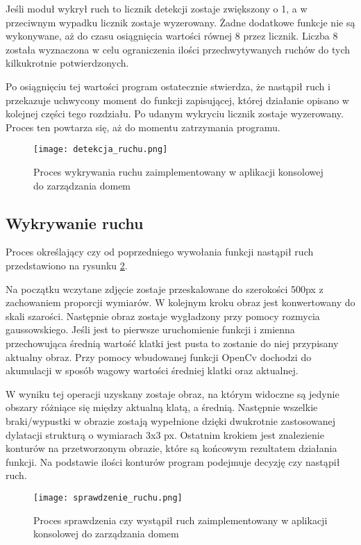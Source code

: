 Jeśli moduł wykrył ruch to licznik detekcji zostaje zwiększony o 1, a w przeciwnym wypadku licznik zostaje wyzerowany. Żadne dodatkowe funkcje nie są wykonywane, aż do czasu osiągnięcia wartości równej 8 przez licznik. Liczba 8 została wyznaczona w celu ograniczenia ilości przechwytywanych ruchów do tych kilkukrotnie potwierdzonych.

Po osiągnięciu tej wartości program ostatecznie stwierdza, że nastąpił ruch i przekazuje uchwycony moment do funkcji zapisującej, której działanie opisano w kolejnej części tego rozdziału. Po udanym wykryciu licznik zostaje wyzerowany. Proces ten powtarza się, aż do momentu zatrzymania programu.
\begin{figure}[H]
	\centering
	\texttt{[image: detekcja\_ruchu.png]}
	\caption{Proces wykrywania ruchu zaimplementowany w aplikacji konsolowej do zarządzania domem}
	\label{fig:proces_detekcji}
\end{figure}

\subsection{Wykrywanie ruchu} \label{ss:wykrywanie}
Proces określający czy od poprzedniego wywołania funkcji nastąpił ruch przedstawiono na rysunku \ref{fig:wykrywanie_ruchu}.

Na początku wczytane zdjęcie zostaje przeskalowane do szerokości 500px z zachowaniem proporcji wymiarów. W kolejnym kroku obraz jest konwertowany do skali szarości. Następnie obraz zostaje wygładzony przy pomocy rozmycia gaussowskiego. Jeśli jest to pierwsze uruchomienie funkcji i zmienna przechowująca średnią wartość klatki jest pusta to zostanie do niej przypisany aktualny obraz. Przy pomocy wbudowanej funkcji OpenCv dochodzi do akumulacji w sposób wagowy wartości średniej klatki oraz aktualnej.     

W wyniku tej operacji uzyskany zostaje obraz, na którym widoczne są jedynie obszary różniące się między aktualną klatą, a średnią. Następnie wszelkie braki/wypustki w obrazie zostają wypełnione dzięki dwukrotnie zastosowanej dylatacji strukturą o wymiarach 3x3 px. Ostatnim krokiem jest znalezienie konturów na przetworzonym obrazie, które są końcowym rezultatem działania funkcji. Na podstawie ilości konturów program podejmuje decyzję czy nastąpił ruch.
 \begin{figure}[H]
	\centering
	\texttt{[image: sprawdzenie\_ruchu.png]}
	\caption{Proces sprawdzenia czy wystąpił ruch zaimplementowany w aplikacji konsolowej do zarządzania domem}
	\label{fig:wykrywanie_ruchu}
\end{figure}

